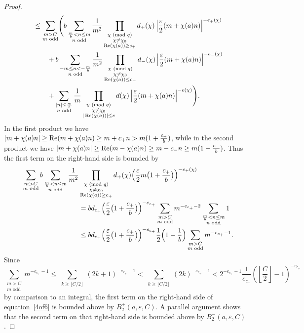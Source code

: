 \documentclass[11pt]{article}
\theoremstyle{plain}
\theoremstyle{definition}
\numberwithin{equation}{section}
\renewcommand{\mod}[1]{{\ifmmode\text{\rm\ (mod~$#1$)}\else\discretionary{}{}{\hbox{\!\!}}\rm(mod~$#1$)\fi}}
\renewcommand{\Re}{\mathop{\rm Re}}
\newcommand{\0}{{\vec 0}}
\begin{document}
\begin{proof}
\begin{align}
&\le \sum_{\substack{m>C \\ m\text{ odd}}} \Biggl( b \sum_{\substack{\frac{m}{b}<n\le m\\ n\text{ odd}}}\frac1{m^2} \prod_{\substack{\chi \mod{q}\\ \chi\neq \chi_0\\ \Re(\chi(a))\ge c_+}} d_+(\chi)\left|\frac{\varepsilon}{2}(m+\chi(a) n)\right|^{-e_+(\chi)} \label{4of6} \\
&\qquad{}+ b \sum_{\substack{-m \le n < -\frac{m}{b} \\ n\text{ odd}}}\frac1{m^2} \prod_{\substack{\chi \mod{q}\\ \chi\neq \chi_0\\ \Re(\chi(a))\le c_-}} d_-(\chi)\left|\frac{\varepsilon}{2}(m+\chi(a) n)\right|^{-e_-(\chi)} \notag \\
&\qquad{}+ \sum_{{\substack{|n| \le \frac{m}{b}\\ n\text{ odd}}}} \frac1m \prod_{\substack{\chi \mod{q}\\ \chi\neq \chi_0 \\ |\Re(\chi(a))|\le c}} d(\chi)\left|\frac{\varepsilon}{2}(m+\chi(a) n)\right|^{-e(\chi)} \Biggr). \notag
\end{align}
In the first product we have $|m+\chi(a)n| \ge \Re(m+\chi(a)n) \ge m+c_+n > m(1+\frac{c_+}b)$, while in the second product we have $|m+\chi(a)n| \ge \Re(m-\chi(a)n) \ge m-c_-n \ge m(1-\frac{c_-}b)$. Thus the first term on the right-hand side is bounded by
\begin{align*}
\sum_{\substack{m>C \\ m\text{ odd}}} b \sum_{\substack{\frac{m}{b}<n\le m\\ n\text{ odd}}}\frac1{m^2} & \prod_{\substack{\chi \mod{q}\\ \chi\neq \chi_0\\ \Re(\chi(a))\ge c_+}} d_+(\chi) \Bigl( \frac{\varepsilon}{2} m \bigl( 1+\frac{c_+}b \bigr) \Bigr)^{-e_+(\chi)} \\
&= b d_{c_+} \Bigl( \frac{\varepsilon}{2} \bigl( 1+\frac{c_+}b \bigr) \Bigr)^{-e_{c_+}} \sum_{\substack{m>C \\ m\text{ odd}}} m^{-e_{c_+}-2} \sum_{\substack{\frac{m}{b}<n\le m\\ n\text{ odd}}} 1 \\
&\le b d_{c_+} \Bigl( \frac{\varepsilon}{2} \bigl( 1+\frac{c_+}b \bigr) \Bigr)^{-e_{c_+}} \frac12\Bigl( 1-\frac1b \Bigr) \sum_{\substack{m>C \\ m\text{ odd}}} m^{-e_{c_+}-1}.
\end{align*}
Since
\[
\sum_{\substack{m>C \\ m\text{ odd}}} m^{-e_{c_+}-1} \le \sum_{\substack{k\ge\lfloor C/2\rfloor}} (2k+1)^{-e_{c_+}-1} < \sum_{\substack{k\ge\lfloor C/2\rfloor}} (2k)^{-e_{c_+}-1} < 2^{-e_{c_+}-1} \frac1{e_{c_+}} \left(\left\lfloor\frac{C}{2}\right\rfloor-1\right)^{-e_{c_+}}
\]
by comparison to an integral, the first term on the right-hand side of equation~\eqref{4of6} is bounded above by $B_2^+(a,\varepsilon,C)$. A parallel argument shows that the second term on that right-hand side is bounded above by $B_2^-(a,\varepsilon,C)$.


\end{proof}
\end{document}
